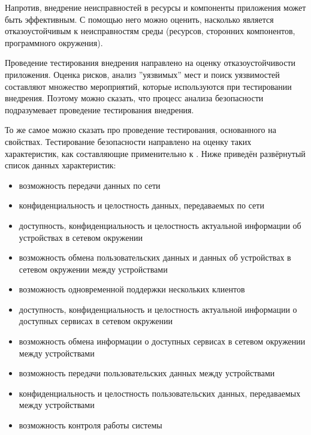 %
Напротив, внедрение неисправностей в ресурсы и компоненты приложения может быть эффективным. 
%
С помощью него можно оценить, насколько  является отказоустойчивым к неисправностям среды (ресурсов, сторонних компонентов, программного окружения). 

%
Проведение тестирования внедрения направлено на оценку отказоустойчивости приложения. 
%
Оценка рисков, анализ ''уязвимых'' мест и поиск уязвимостей составляют множество мероприятий, которые используются при тестировании внедрения. 
%
Поэтому можно сказать, что процесс анализа безопасности  подразумевает проведение тестирования внедрения. 

%
То же самое можно сказать про проведение тестирования, основанного на свойствах. 
%
Тестирование безопасности  направлено на оценку таких характеристик, как составляющие  применительно к . Ниже приведён развёрнутый список данных характеристик:
\begin{itemize}
	\setlength{\itemsep}{0pt}%

	\item возможность передачи данных по сети
	\item конфиденциальность и целостность данных, передаваемых по сети

	\item доступность, конфиденциальность и целостность актуальной информации об устройствах в сетевом окружении
	\item возможность обмена пользовательских данных и данных об устройствах в сетевом окружении между устройствами
	\item возможность одновременной поддержки нескольких клиентов

	\item доступность, конфиденциальность и целостность актуальной информации о доступных сервисах в сетевом окружении
	\item возможность обмена информации о доступных сервисах в сетевом окружении между устройствами

	\item возможность передачи пользовательских данных между устройствами
	\item конфиденциальность и целостность пользовательских данных, передаваемых между устройствами
	\item возможность контроля работы системы
\end{itemize}

